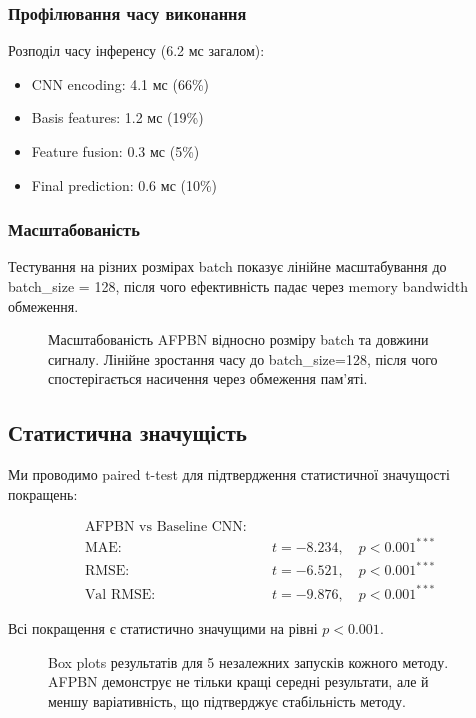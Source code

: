 \documentclass[12pt,a4paper]{article}
\begin{document}
\subsubsection{Профілювання часу виконання}

Розподіл часу інференсу (6.2 мс загалом):
\begin{itemize}
	\item CNN encoding: 4.1 мс (66\%)
	\item Basis features: 1.2 мс (19\%)
	\item Feature fusion: 0.3 мс (5\%)
	\item Final prediction: 0.6 мс (10\%)
\end{itemize}

\subsubsection{Масштабованість}

Тестування на різних розмірах batch показує лінійне масштабування до batch\_size = 128, після чого ефективність падає через memory bandwidth обмеження.

\begin{figure}[htbp]
	\centering
	\caption{Масштабованість AFPBN відносно розміру batch та довжини сигналу. Лінійне зростання часу до batch\_size=128, після чого спостерігається насичення через обмеження пам'яті.}
	\label{fig:scalability}
\end{figure}

\subsection{Статистична значущість}

Ми проводимо paired t-test для підтвердження статистичної значущості покращень:

\begin{align}
	\text{AFPBN vs Baseline CNN:} \quad &\\
	\text{MAE:} \quad &t = -8.234, \quad p < 0.001^{***} \\
	\text{RMSE:} \quad &t = -6.521, \quad p < 0.001^{***} \\
	\text{Val RMSE:} \quad &t = -9.876, \quad p < 0.001^{***}
\end{align}

Всі покращення є статистично значущими на рівні $p < 0.001$.

\begin{figure}[htbp]
	\centering
	\caption{Box plots результатів для 5 незалежних запусків кожного методу. AFPBN демонструє не тільки кращі середні результати, але й меншу варіативність, що підтверджує стабільність методу.}
	\label{fig:statistical_significance}
\end{figure}
\end{document}
